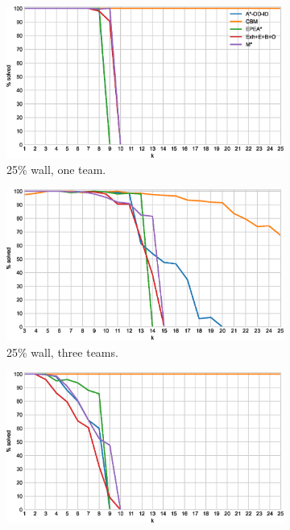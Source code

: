\documentclass[english]{article}
\newcommand\graphwidth{0.49\textwidth}
\begin{document}
	\begin{figure}[b]
		\centering
		\begin{subfigure}{\graphwidth}
			\centering
			\includegraphics[width=\linewidth]{img/results/relative-comparison/25-1-p}
			\caption{25\% wall, one team.}
			\label{fig:r-25-1-p}
		\end{subfigure}
		\begin{subfigure}{\graphwidth}
			\centering
			\includegraphics[width=\linewidth]{img/results/relative-comparison/25-3-p}
			\caption{25\% wall, three teams.}
			\label{fig:r-25-3-p}
		\end{subfigure}
		\begin{subfigure}{\graphwidth}
			\centering
			\includegraphics[width=\linewidth]{img/results/relative-comparison/75-1-p}

\end{subfigure}
\end{figure}
\end{document}
